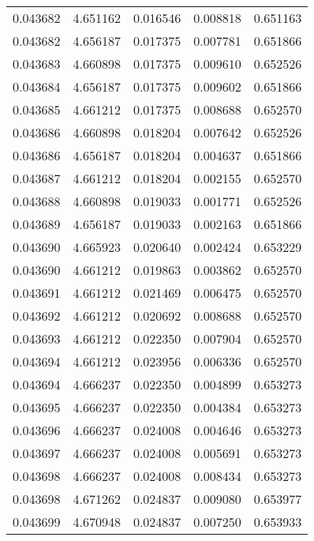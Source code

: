 \begin{tabular}{lrrrr}
0.043682    &  4.651162 &  0.016546 &  0.008818 &             0.651163 \\
0.043682    &  4.656187 &  0.017375 &  0.007781 &             0.651866 \\
0.043683    &  4.660898 &  0.017375 &  0.009610 &             0.652526 \\
0.043684    &  4.656187 &  0.017375 &  0.009602 &             0.651866 \\
0.043685    &  4.661212 &  0.017375 &  0.008688 &             0.652570 \\
0.043686    &  4.660898 &  0.018204 &  0.007642 &             0.652526 \\
0.043686    &  4.656187 &  0.018204 &  0.004637 &             0.651866 \\
0.043687    &  4.661212 &  0.018204 &  0.002155 &             0.652570 \\
0.043688    &  4.660898 &  0.019033 &  0.001771 &             0.652526 \\
0.043689    &  4.656187 &  0.019033 &  0.002163 &             0.651866 \\
0.043690    &  4.665923 &  0.020640 &  0.002424 &             0.653229 \\
0.043690    &  4.661212 &  0.019863 &  0.003862 &             0.652570 \\
0.043691    &  4.661212 &  0.021469 &  0.006475 &             0.652570 \\
0.043692    &  4.661212 &  0.020692 &  0.008688 &             0.652570 \\
0.043693    &  4.661212 &  0.022350 &  0.007904 &             0.652570 \\
0.043694    &  4.661212 &  0.023956 &  0.006336 &             0.652570 \\
0.043694    &  4.666237 &  0.022350 &  0.004899 &             0.653273 \\
0.043695    &  4.666237 &  0.022350 &  0.004384 &             0.653273 \\
0.043696    &  4.666237 &  0.024008 &  0.004646 &             0.653273 \\
0.043697    &  4.666237 &  0.024008 &  0.005691 &             0.653273 \\
0.043698    &  4.666237 &  0.024008 &  0.008434 &             0.653273 \\
0.043698    &  4.671262 &  0.024837 &  0.009080 &             0.653977 \\
0.043699    &  4.670948 &  0.024837 &  0.007250 &             0.653933 \\

\end{tabular}
